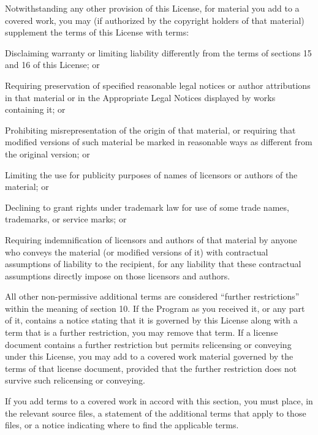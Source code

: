 Notwithstanding any other provision of this License, for material you add to a covered work, you may (if authorized by the copyright holders of that material) supplement the terms of this License with terms:
  \startitemize[n]
  \item Disclaiming warranty or limiting liability differently from the terms of sections 15 and 16 of this License; or

  \item Requiring preservation of specified reasonable legal notices or author attributions in that material or in the Appropriate Legal Notices displayed by works containing it; or

  \item Prohibiting misrepresentation of the origin of that material, or requiring that modified versions of such material be marked in reasonable ways as different from the original version; or

  \item Limiting the use for publicity purposes of names of licensors or authors of the material; or

  \item Declining to grant rights under trademark law for use of some trade names, trademarks, or service marks; or

  \item Requiring indemnification of licensors and authors of that material by anyone who conveys the material (or modified versions of it) with contractual assumptions of liability to the recipient, for any liability that these contractual assumptions directly impose on those licensors and authors.
  \stopitemize

All other non-permissive additional terms are considered ``further restrictions'' within the meaning of section 10.  If the Program as you received it, or any part of it, contains a notice stating that it is governed by this License along with a term that is a further restriction, you may remove that term.  If a license document contains a further restriction but permits relicensing or conveying under this License, you may add to a covered work material governed by the terms of that license document, provided that the further restriction does not survive such relicensing or conveying.

If you add terms to a covered work in accord with this section, you must place, in the relevant source files, a statement of the additional terms that apply to those files, or a notice indicating where to find the applicable terms.

